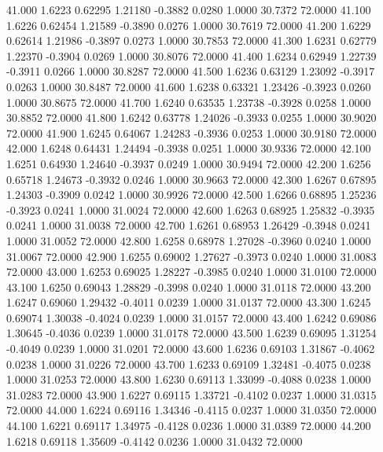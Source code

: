   41.000   1.6223   0.62295   1.21180  -0.3882   0.0280   1.0000  30.7372  72.0000
  41.100   1.6226   0.62454   1.21589  -0.3890   0.0276   1.0000  30.7619  72.0000
  41.200   1.6229   0.62614   1.21986  -0.3897   0.0273   1.0000  30.7853  72.0000
  41.300   1.6231   0.62779   1.22370  -0.3904   0.0269   1.0000  30.8076  72.0000
  41.400   1.6234   0.62949   1.22739  -0.3911   0.0266   1.0000  30.8287  72.0000
  41.500   1.6236   0.63129   1.23092  -0.3917   0.0263   1.0000  30.8487  72.0000
  41.600   1.6238   0.63321   1.23426  -0.3923   0.0260   1.0000  30.8675  72.0000
  41.700   1.6240   0.63535   1.23738  -0.3928   0.0258   1.0000  30.8852  72.0000
  41.800   1.6242   0.63778   1.24026  -0.3933   0.0255   1.0000  30.9020  72.0000
  41.900   1.6245   0.64067   1.24283  -0.3936   0.0253   1.0000  30.9180  72.0000
  42.000   1.6248   0.64431   1.24494  -0.3938   0.0251   1.0000  30.9336  72.0000
  42.100   1.6251   0.64930   1.24640  -0.3937   0.0249   1.0000  30.9494  72.0000
  42.200   1.6256   0.65718   1.24673  -0.3932   0.0246   1.0000  30.9663  72.0000
  42.300   1.6267   0.67895   1.24303  -0.3909   0.0242   1.0000  30.9926  72.0000
  42.500   1.6266   0.68895   1.25236  -0.3923   0.0241   1.0000  31.0024  72.0000
  42.600   1.6263   0.68925   1.25832  -0.3935   0.0241   1.0000  31.0038  72.0000
  42.700   1.6261   0.68953   1.26429  -0.3948   0.0241   1.0000  31.0052  72.0000
  42.800   1.6258   0.68978   1.27028  -0.3960   0.0240   1.0000  31.0067  72.0000
  42.900   1.6255   0.69002   1.27627  -0.3973   0.0240   1.0000  31.0083  72.0000
  43.000   1.6253   0.69025   1.28227  -0.3985   0.0240   1.0000  31.0100  72.0000
  43.100   1.6250   0.69043   1.28829  -0.3998   0.0240   1.0000  31.0118  72.0000
  43.200   1.6247   0.69060   1.29432  -0.4011   0.0239   1.0000  31.0137  72.0000
  43.300   1.6245   0.69074   1.30038  -0.4024   0.0239   1.0000  31.0157  72.0000
  43.400   1.6242   0.69086   1.30645  -0.4036   0.0239   1.0000  31.0178  72.0000
  43.500   1.6239   0.69095   1.31254  -0.4049   0.0239   1.0000  31.0201  72.0000
  43.600   1.6236   0.69103   1.31867  -0.4062   0.0238   1.0000  31.0226  72.0000
  43.700   1.6233   0.69109   1.32481  -0.4075   0.0238   1.0000  31.0253  72.0000
  43.800   1.6230   0.69113   1.33099  -0.4088   0.0238   1.0000  31.0283  72.0000
  43.900   1.6227   0.69115   1.33721  -0.4102   0.0237   1.0000  31.0315  72.0000
  44.000   1.6224   0.69116   1.34346  -0.4115   0.0237   1.0000  31.0350  72.0000
  44.100   1.6221   0.69117   1.34975  -0.4128   0.0236   1.0000  31.0389  72.0000
  44.200   1.6218   0.69118   1.35609  -0.4142   0.0236   1.0000  31.0432  72.0000

